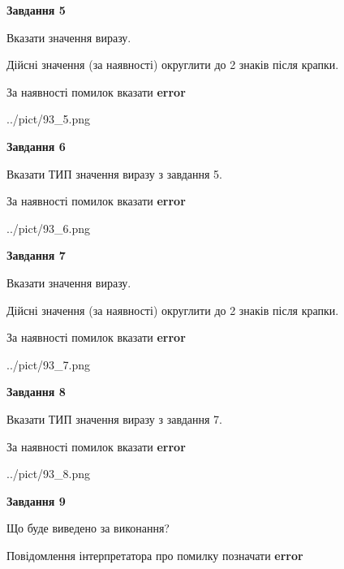 \documentclass[11pt, ukrainian]{article}
\begin{document}
{\begin {large}
{\begin {center}\textbf{Завдання 5}\end {center}}\par
Вказати значення виразу. \par
Дійсні значення (за наявності) округлити до 2 знаків після крапки. \par
За наявності помилок вказати \textbf{error}

\begin{center}
	{../pict/93_5.png}
\end{center}
\newpage

{\begin {center}\textbf{Завдання 6}\end {center}}\par
Вказати ТИП значення виразу з завдання 5. \par
За наявності помилок вказати \textbf{error}

\begin{center}
	{../pict/93_6.png}
\end{center}
\newpage

{\begin {center}\textbf{Завдання 7}\end {center}}\par
Вказати значення виразу. \par
Дійсні значення (за наявності) округлити до 2 знаків після крапки. \par
За наявності помилок вказати \textbf{error}

\begin{center}
	{../pict/93_7.png}
\end{center}
\newpage

{\begin {center}\textbf{Завдання 8}\end {center}}\par
Вказати ТИП значення виразу з завдання 7. \par
За наявності помилок вказати \textbf{error}

\begin{center}
	{../pict/93_8.png}
\end{center}
\newpage

{\begin {center}\textbf{Завдання 9}\end {center}}\par
Що буде виведено за виконання? \par
Повідомлення інтерпретатора про помилку позначати \textbf{error}


\end{large}}
\end{document}
